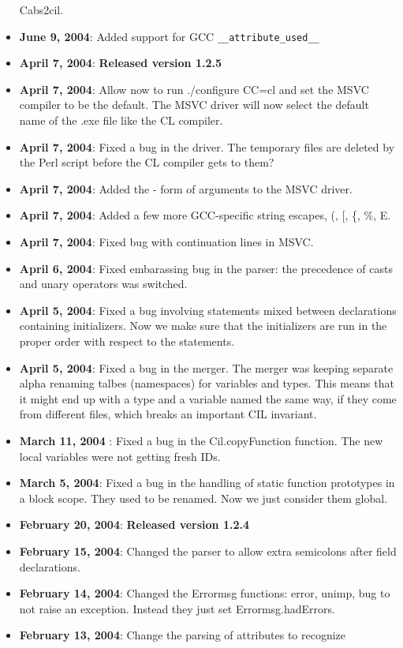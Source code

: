 \documentclass{article}
\def\t#1{{\tt #1}}
\begin{document}
\begin{itemize}
Cabs2cil. 
\item {\bf June 9, 2004}: Added support for GCC \t{\_\_attribute\_used\_\_}
\item {\bf April 7, 2004}: {\bf Released version 1.2.5}
\item {\bf April 7, 2004}: Allow now to run ./configure CC=cl and set the MSVC
compiler to be the default. The MSVC driver will now select the default name
of the .exe file like the CL compiler. 
\item {\bf April 7, 2004}: Fixed a bug in the driver. The temporary files are
deleted by the Perl script before the CL compiler gets to them?
\item {\bf April 7, 2004}: Added the - form of arguments to the MSVC driver.
\item {\bf April 7, 2004}: Added a few more GCC-specific string escapes, (, [,
\{, \%, E. 
\item {\bf April 7, 2004}: Fixed bug with continuation lines in MSVC.
\item {\bf April 6, 2004}: Fixed embarassing bug in the parser: the precedence
  of casts and unary operators was switched. 
\item {\bf April 5, 2004}: Fixed a bug involving statements mixed between
declarations containing initializers. Now we make sure that the initializers
are run in the proper order with respect to the statements.
\item {\bf April 5, 2004}: Fixed a bug in the merger. The merger was keeping
separate alpha renaming talbes (namespaces) for variables and types. This
means that it might end up with a type and a variable named the same way, if
they come from different files, which breaks an important CIL invariant.
\item {\bf March 11, 2004} : Fixed a bug in the Cil.copyFunction function. The
new local variables were not getting fresh IDs. 
\item {\bf March 5, 2004}: Fixed a bug in the handling of static function
  prototypes in a block scope. They used to be renamed. Now we just consider
  them global. 
\item {\bf February 20, 2004}: {\bf Released version 1.2.4}
\item {\bf February 15, 2004}: Changed the parser to allow extra semicolons
  after field declarations.
\item {\bf February 14, 2004}: Changed the Errormsg functions: error, unimp,
bug to not raise an exception. Instead they just set Errormsg.hadErrors. 
\item {\bf February 13, 2004}: Change the parsing of attributes to recognize

\end{itemize}
\end{document}
